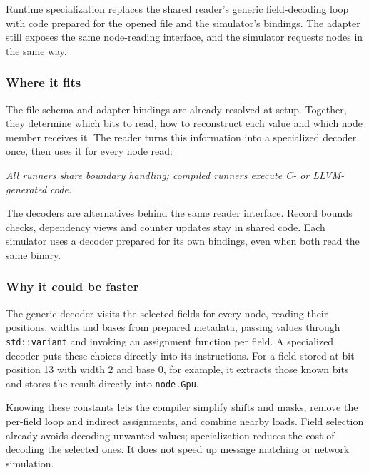 \documentclass[10pt,a4paper]{article}
\begin{document}
Runtime specialization replaces the shared reader's generic field-decoding loop with code prepared for the opened file and the simulator's bindings. The adapter still exposes the same node-reading interface, and the simulator requests nodes in the same way.

\hypertarget{where-it-fits}{}
\subsubsection{Where it fits}

The file schema and adapter bindings are already resolved at setup. Together, they determine which bits to read, how to reconstruct each value and which node member receives it. The reader turns this information into a specialized decoder once, then uses it for every node read:

\begin{center}
\begin{minipage}{\linewidth}
\centering
\resizebox{0.94\linewidth}{!}{}
\par\small\itshape All runners share boundary handling; compiled runners execute C- or LLVM-generated code.
\end{minipage}
\end{center}

The decoders are alternatives behind the same reader interface. Record bounds checks, dependency views and counter updates stay in shared code. Each simulator uses a decoder prepared for its own bindings, even when both read the same binary.

\hypertarget{why-it-could-be-faster}{}
\subsubsection{Why it could be faster}

The generic decoder visits the selected fields for every node, reading their positions, widths and bases from prepared metadata, passing values through \texttt{std::\allowbreak{}variant} and invoking an assignment function per field. A specialized decoder puts these choices directly into its instructions. For a field stored at bit position 13 with width 2 and base 0, for example, it extracts those known bits and stores the result directly into \texttt{node.\allowbreak{}Gpu}.

Knowing these constants lets the compiler simplify shifts and masks, remove the per-field loop and indirect assignments, and combine nearby loads. Field selection already avoids decoding unwanted values; specialization reduces the cost of decoding the selected ones. It does not speed up message matching or network simulation.
\end{document}
